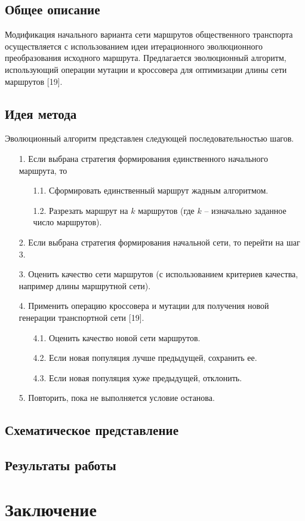 \subsection{Общее описание}
Модификация начального варианта сети маршрутов общественного транспорта осуществляется с использованием идеи 
итерационного эволюционного преобразования исходного маршрута. Предлагается эволюционный алгоритм, 
использующий операции мутации и кроссовера для оптимизации длины сети маршрутов [19].

\subsection{Идея метода}
Эволюционный алгоритм представлен следующей последовательностью шагов. 
\begin{enumerate}
    \item[1.] Если выбрана стратегия формирования единственного начального маршрута, то 
    \begin{enumerate}
        \item[1.1.] Сформировать единственный маршрут жадным алгоритмом.
        \item[1.2.] Разрезать маршрут на \( k \) маршрутов (где \( k \) -- изначально заданное число 
            маршрутов).
    \end{enumerate}
    \item[2.] Если выбрана стратегия формирования начальной сети, то перейти на шаг 3.
    \item[3.] Оценить качество сети маршрутов (с использованием критериев качества, например длины 
        маршрутной сети).
    \item[4.] Применить операцию кроссовера и мутации для получения новой генерации транспортной сети [19].
    \begin{enumerate}
        \item[4.1.] Оценить качество новой сети маршрутов.
        \item[4.2.] Если новая популяция лучше предыдущей, сохранить ее.
        \item[4.3.] Если новая популяция хуже предыдущей, отклонить. 
    \end{enumerate}
    \item[5.] Повторить, пока не выполняется условие останова.
\end{enumerate}

\subsection{Схематическое представление}
\subsection{Результаты работы}


\section{Заключение}